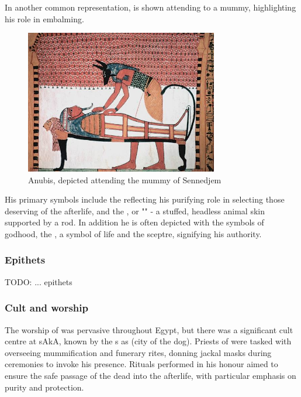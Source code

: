 In another common representation,  is shown attending to a mummy, highlighting his role in embalming.

\begin{figure} [H]
	\centering
	\includegraphics[width=0.75\textwidth]{../photos/Anubis_Sennedjem}
	\caption{Anubis, depicted attending the mummy of Sennedjem}
\end{figure}

His primary symbols include the  reflecting his purifying role in selecting those deserving of the afterlife, and the , or "" - a stuffed, headless animal skin supported by a rod. In addition he is often depicted with the symbols of godhood, the , a symbol of life and the  sceptre, signifying his authority.

\subsubsection*{Epithets}

TODO: ... epithets

\subsubsection*{Cult and worship}
The worship of  was pervasive throughout Egypt, but there was a significant cult centre at sAkA, known by the s as  (city of the dog). Priests of  were tasked with overseeing mummification and funerary rites, donning jackal masks during ceremonies to invoke his presence. Rituals performed in his honour aimed to ensure the safe passage of the dead into the afterlife, with particular emphasis on purity and protection.

